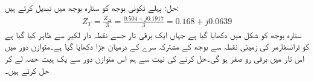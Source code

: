 حل:\quad
پہلے تکونی بوجھ کو ستارہ بوجھ میں تبدیل کرتے ہیں:
\begin{align*}
Z_Y= \frac{Z_\Delta}{3}=\frac{0.504+j0.1917}{3}=0.168+j0.0639
\end{align*}
ستارہ بوجھ کو شکل  میں دکھایا گیا ہے جہاں ایک برقی تار جسے نقطہ دار لکیر سے ظاہر کیا گیا ہے کو ٹرانسفارمر کی زمینی نقطہ سے بوجھ کے مشترکہ سرے کے درمیان جڑا دکھایا گیا ہے۔متوازن دور میں اس تار میں برقی رو صفر ہو گی۔حل کرنے کی نیت سے ہم اس متوازن دور سے یک ہیت حصہ لے کر حل کرتے ہیں۔
\begin{figure}
\centering
\end{figure}
